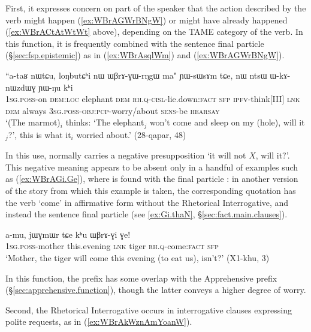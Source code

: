 First, it expresses concern on part of the speaker that the action described by the verb might happen (\ref{ex:WBrAGWrBNgW}) or might have already happened (\ref{ex:WBrACtAtWtWt} above), depending on the TAME category of the verb. In this function, it is frequently combined with the sentence final particle  (§\ref{sec:fsp.epistemic}) as in (\ref{ex:WBrAsqlWm}) and (\ref{ex:WBrAGWrBNgW}).
 
 \begin{exe}
\ex \label{ex:WBrAGWrBNgW}
\gll  ``a-taʁ nɯtɕu,  loŋbutɕʰi nɯ ɯβrɤ-ɣɯ-rŋgɯ ma" ɲɯ-sɯsɤm tɕe, nɯ ntsɯ ɯ-kɤ-nɯzdɯɣ ɲɯ-ŋu kʰi \\ 
\textsc{1sg}.\textsc{poss}-on \textsc{dem}:\textsc{loc} elephant \textsc{dem} \textsc{rh}.\textsc{q}-\textsc{cisl}-lie.down:\textsc{fact} \textsc{sfp} \textsc{ipfv}-think[III] \textsc{lnk} \textsc{dem} always \textsc{3sg}.\textsc{poss}-\textsc{obj}:\textsc{pcp}-worry/about \textsc{sens}-be \textsc{hearsay} \\
\glt `(The marmot)$_i$ thinks: `The elephant$_j$ won't come and sleep on my (hole), will it$_j$?', this is what it$_i$ worried about.' (28-qapar, 48)
\end{exe}

In this use,  normally carries a negative presupposition `it will not $X$, will it?'. This negative meaning appears to be absent only  in a handful of examples such as (\ref{ex:WBrAGi.Ge}), where  is found with the final particle : in another version of the story from which this example is taken, the corresponding quotation has the verb  `come' in affirmative form without the Rhetorical Interrogative, and instead the sentence final particle  (see \ref{ex:Gi.thaN}, §\ref{sec:fact.main.clauses}).

\begin{exe}
\ex \label{ex:WBrAGi.Ge}
\gll  a-mu, jɯɣmɯr tɕe kʰu ɯβrɤ-ɣi ɣe! \\
\textsc{1sg}.\textsc{poss}-mother this.evening \textsc{lnk} tiger \textsc{rh}.\textsc{q}-come:\textsc{fact} \textsc{sfp} \\
\glt `Mother, the tiger will come this evening (to eat us), isn't?' (X1-khu, 3)
\end{exe}
 
In this function, the prefix  has some overlap with the Apprehensive prefix  (§\ref{sec:apprehensive.function}), though the latter conveys a higher degree of worry.

Second, the Rhetorical Interrogative occurs in interrogative clauses expressing polite requests, as in (\ref{ex:WBrAkWznAmYoanW}).   

